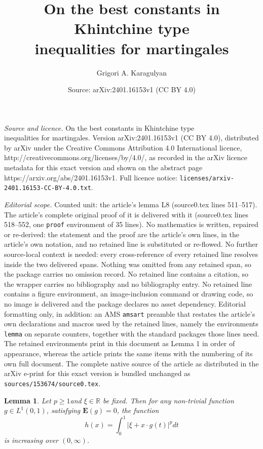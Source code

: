 \documentclass[10pt,a4paper]{amsart}
\title{On the best constants in Khintchine type \\inequalities for martingales}
\author{Grigori A. Karagulyan}
\date{Source: arXiv:2401.16153v1 (CC BY 4.0)}
\newtheorem{lemma}{Lemma}
\def\ZE{\ensuremath{\mathbf E}}
\def\ZR{\ensuremath{\mathbb R}}
\begin{document}
\maketitle

\noindent\emph{Source and licence.} On the best constants in Khintchine type \\inequalities for martingales. Version arXiv:2401.16153v1 (CC BY 4.0), distributed by arXiv under the Creative Commons Attribution 4.0 International licence, http://creativecommons.org/licenses/by/4.0/, as recorded in the arXiv licence metadata for this exact version and shown on the abstract page https://arxiv.org/abs/2401.16153v1. Full licence notice: \texttt{licenses/arxiv-2401.16153-CC-BY-4.0.txt}.\par\smallskip

\noindent\textit{Editorial scope.} Counted unit: the article's lemma L8 (source0.tex lines 511--517). The article's complete original proof of it is delivered with it (source0.tex lines 518--552, one \texttt{proof} environment of 35 lines). No mathematics is written, repaired or re-derived: the statement and the proof are the article's own lines, in the article's own notation, and no retained line is substituted or re-flowed.  No further source-local context is needed: every cross-reference of every retained line resolves inside the two delivered spans.  Nothing was omitted from any retained span, so the package carries no omission record.  No retained line contains a citation, so the wrapper carries no bibliography and no bibliography entry.  No retained line contains a figure environment, an image-inclusion command or drawing code, so no image is delivered and the package declares no asset dependency.  Editorial formatting only, in addition: an AMS \texttt{amsart} preamble that restates the article's own declarations and macros used by the retained lines, namely the environments \texttt{lemma} on separate counters, together with the standard packages those lines need.  The retained environments print in this document as Lemma 1 in order of appearance, whereas the article prints the same items with the numbering of its own full document.  The complete native source of the article as distributed in the arXiv e-print for this exact version is bundled unchanged as \texttt{sources/153674/source0.tex}.
\begin{lemma}\label{L8}
	Let $p\ge 1$and $\xi\in \ZR$ be fixed. Then for any non-trivial function $g\in L^1(0,1)$, satisfying $\ZE(g)=0$, the function
	\begin{equation}
		h(x)=\int_0^1\left|\xi+x\cdot g(t)\right|^pdt
	\end{equation}
is increasing over $(0,\infty)$.
\end{lemma}
\end{document}
